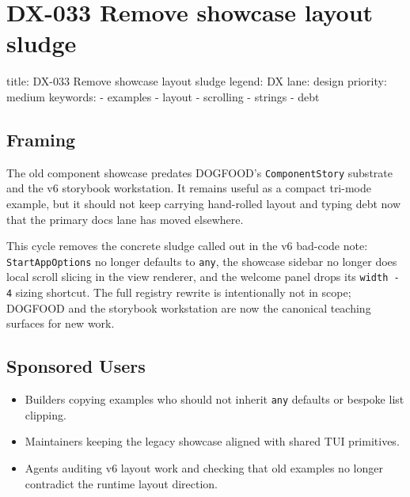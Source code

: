 \chapter{DX-033 Remove showcase layout sludge}\label{record-131}

\smallskip

\begin{RecordMeta}
title: DX-033 Remove showcase layout sludge
legend: DX
lane: design
priority: medium
keywords:
  - examples
  - layout
  - scrolling
  - strings
  - debt

\end{RecordMeta}

\section{Framing}\label{record-131-framing}

The old component showcase predates DOGFOOD's \texttt{C\allowbreak{}o\allowbreak{}m\allowbreak{}p\allowbreak{}o\allowbreak{}n\allowbreak{}e\allowbreak{}n\allowbreak{}t\allowbreak{}S\allowbreak{}t\allowbreak{}o\allowbreak{}r\allowbreak{}y} substrate and the v6 storybook workstation. It remains useful as a compact tri-mode example, but it should not keep carrying hand-rolled layout and typing debt now that the primary docs lane has moved elsewhere.

This cycle removes the concrete sludge called out in the v6 bad-code note: \texttt{S\allowbreak{}t\allowbreak{}a\allowbreak{}r\allowbreak{}t\allowbreak{}A\allowbreak{}p\allowbreak{}p\allowbreak{}O\allowbreak{}p\allowbreak{}t\allowbreak{}i\allowbreak{}o\allowbreak{}n\allowbreak{}s} no longer defaults to \texttt{a\allowbreak{}n\allowbreak{}y}, the showcase sidebar no longer does local scroll slicing in the view renderer, and the welcome panel drops its \texttt{w\allowbreak{}i\allowbreak{}d\allowbreak{}t\allowbreak{}h\allowbreak{} \allowbreak{}-\allowbreak{} \allowbreak{}4} sizing shortcut. The full registry rewrite is intentionally not in scope; DOGFOOD and the storybook workstation are now the canonical teaching surfaces for new work.

\section{Sponsored Users}\label{record-131-sponsored-users}

\begin{itemize}
\tightlist
\item
  Builders copying examples who should not inherit \texttt{a\allowbreak{}n\allowbreak{}y} defaults or bespoke list clipping.
\item
  Maintainers keeping the legacy showcase aligned with shared TUI primitives.
\item
  Agents auditing v6 layout work and checking that old examples no longer contradict the runtime layout direction.
\end{itemize}


